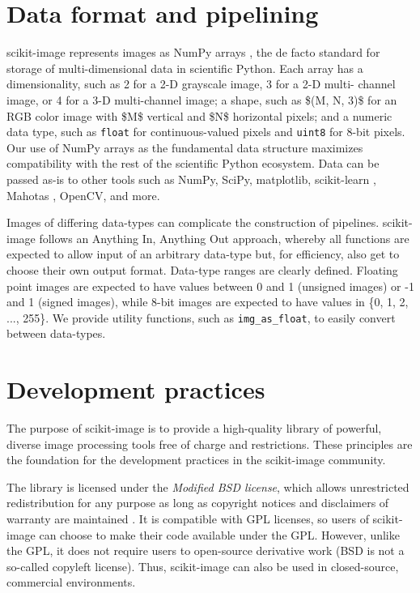 \documentclass[fleqn,12pt]{wlpeerj}
\begin{document}
\section*{Data format and pipelining}
  \label{data-format-and-pipelining}

scikit-image represents images as NumPy arrays \citep{numpy}, the de facto standard
for storage of multi-dimensional data in scientific Python. Each array has a
dimensionality, such as 2 for a 2-D grayscale image, 3 for a 2-D multi-
channel image, or 4 for a 3-D multi-channel image; a shape, such as \$(M, N, 3)\$
for an RGB color image with \$M\$ vertical and \$N\$ horizontal pixels; and a
numeric data type, such as \texttt{float} for continuous-valued pixels and \texttt{uint8}
for 8-bit pixels. Our use of NumPy arrays as the fundamental data structure
maximizes compatibility with the rest of the scientific Python ecosystem.
Data can be passed as-is to other tools such as NumPy, SciPy, matplotlib,
scikit-learn \citep{scikit-learn}, Mahotas \citep{Mahotas}, OpenCV, and more.

Images of differing data-types can complicate the construction of pipelines.
scikit-image follows an \textquotedbl{}Anything In, Anything Out\textquotedbl{} approach, whereby all
functions are expected to allow input of an arbitrary data-type but, for
efficiency, also get to choose their own output format. Data-type
ranges are clearly defined. Floating point images are expected to have
values between 0 and 1 (unsigned images) or -1 and 1 (signed images), while
8-bit images are expected to have values in \{0, 1, 2, ..., 255\}. We provide
utility functions, such as \texttt{img\_as\_float}, to easily convert between
data-types.

\section*{Development practices}
  \label{development-practices}

The purpose of scikit-image is to provide a high-quality library of powerful,
diverse image processing tools free of charge and restrictions. These
principles are the foundation for the development practices in the scikit-image
community.

The library is licensed under the \emph{Modified BSD license}, which allows
unrestricted redistribution for any purpose as long as copyright notices
and disclaimers of warranty are maintained \citep{BSD}. It is compatible with GPL
licenses, so users of scikit-image can choose to make their code available
under the GPL. However, unlike the GPL, it does not require users to
open-source derivative work (BSD is not a so-called copyleft license). Thus,
scikit-image can also be used in closed-source, commercial environments.
\end{document}
